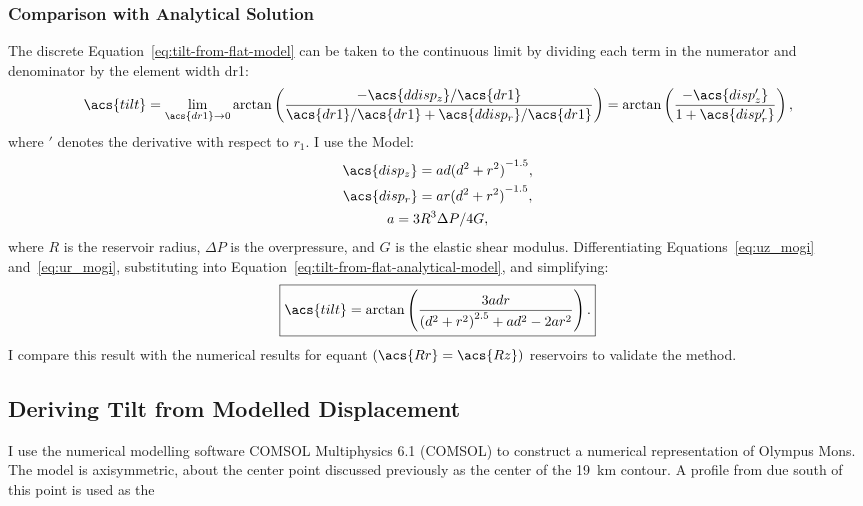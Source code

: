 \subsubsection{Comparison with Analytical Solution}
The discrete Equation~\eqref{eq:tilt-from-flat-model} can be taken to the continuous limit by dividing each term in the numerator and denominator by the element width \acs{dr1}:
\begin{equation}
\acs{tilt}
    = \lim_{\acs{dr1}\to0} 
    \arctan\left(\dfrac{-\acs{ddisp_z}/\acs{dr1}}{\acs{dr1}/\acs{dr1}
    + \acs{ddisp_r}/\acs{dr1}}\right) = 
    \arctan\left(\dfrac{-\acs{disp_z'}}{1+\acs{disp_r'}}\right),\label{eq:tilt-from-flat-analytical-model}
\end{equation}
where $'$ denotes the derivative with respect to $r_1$. I use the \textcite{mogi_relations_1958} Model:
\begin{gather}
    \acs{disp_z} = ad{(d^2+r^2)}^{-1.5},\label{eq:uz_mogi}\\
    \acs{disp_r} = ar{(d^2+r^2)}^{-1.5},\label{eq:ur_mogi}\\
    a = {3R^3\Delta P}/{4G},\nonumber
\end{gather}
where $R$ is the reservoir radius, $\Delta P$ is the overpressure, and $G$ is the elastic shear modulus. Differentiating Equations~\eqref{eq:uz_mogi} and~\eqref{eq:ur_mogi}, substituting into Equation~\eqref{eq:tilt-from-flat-analytical-model}, and simplifying:
\begin{equation}
    \boxed{\acs{tilt} = \arctan\left(\frac{3adr}{{(d^2+r^2)}^{2.5}+ad^2-2ar^2}\right).}\label{eq:tilt-from-mogi-model}
\end{equation}
I compare this result with the numerical results for equant $(\acs{Rr}=\acs{Rz})$ reservoirs to validate the method.

\subsection{Deriving Tilt from Modelled Displacement}

I use the numerical modelling software COMSOL Multiphysics 6.1 (COMSOL) to construct a numerical representation of Olympus Mons. The model is axisymmetric, about the center point discussed previously as the center of the \qty{19}{\km} contour. A profile from due south of this point is used as the 

